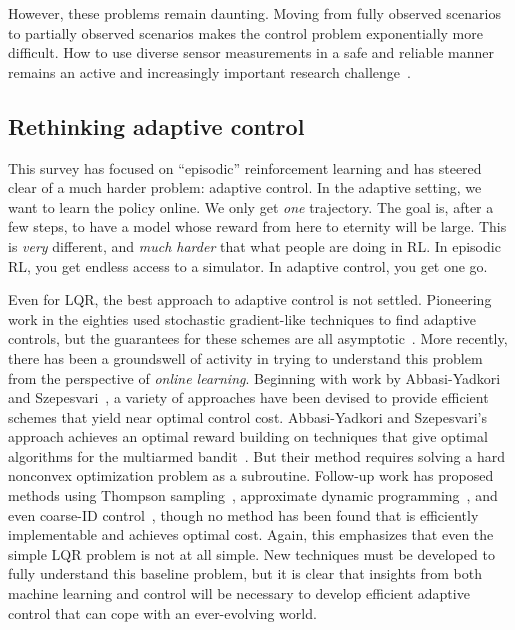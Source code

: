 \documentclass[11pt]{article}
\numberwithin{equation}{section}
\begin{document}
However, these problems remain daunting. Moving from fully observed scenarios to partially observed scenarios makes the  control problem exponentially more difficult. How to use diverse sensor measurements in a safe and reliable manner remains an active and increasingly important research challenge~\cite{akametalu2014reachability,aswani2013provably,berkenkamp2017safe}.

\subsection{Rethinking adaptive control}

This survey has focused on ``episodic'' reinforcement learning and has steered clear of a much harder problem: adaptive control. In the adaptive setting, we want to learn the policy online. We only get \emph{one} trajectory. The goal is, after a few steps, to have a model whose reward from here to eternity will be large. This is \emph{very} different, and \emph{much harder} that what people are doing in RL. In episodic RL, you get endless access to a simulator. In adaptive control, you get one go.

Even for LQR, the best approach to adaptive control is not settled. Pioneering work in the eighties used stochastic gradient-like techniques to find adaptive controls, but the guarantees for these schemes are all asymptotic~\cite{goodwin1981discrete}. More recently, there has been a groundswell of activity in trying to understand this problem from the perspective of \emph{online learning}. Beginning with work by Abbasi-Yadkori and Szepesvari~\cite{abbasi2011regret}, a variety of approaches have been devised to provide efficient schemes that yield near optimal control cost. Abbasi-Yadkori and Szepesvari's approach achieves an optimal reward building on techniques that give optimal algorithms for the multiarmed bandit~\cite{auer2002finite,lai1985asymptotically}. But their method requires solving a hard nonconvex optimization problem as a subroutine. Follow-up work has proposed methods using Thompson sampling~\cite{abbasi15,abeille17,17.Ouyang.LQR}, approximate dynamic programming~\cite{abbasi18}, and even coarse-ID control~\cite{Dean18}, though no method has been found that is efficiently implementable and achieves optimal cost. Again, this emphasizes that even the simple LQR problem is not at all simple. New techniques must be developed to fully understand this baseline problem, but it is clear that insights from both machine learning and control will be necessary to develop efficient adaptive control that can cope with an ever-evolving world.
\end{document}
